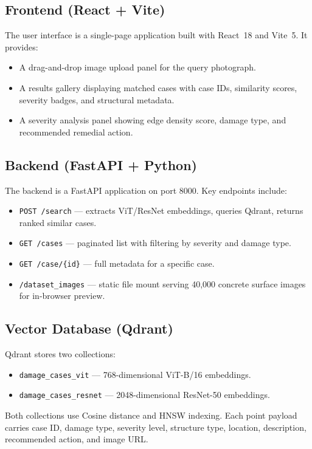\documentclass[conference]{IEEEtran}
\begin{document}
\subsection{Frontend (React + Vite)}
The user interface is a single-page application built with React~18 and Vite~5. It provides:
\begin{itemize}
  \item A drag-and-drop image upload panel for the query photograph.
  \item A results gallery displaying matched cases with case IDs, similarity scores, severity badges, and structural metadata.
  \item A severity analysis panel showing edge density score, damage type, and recommended remedial action.
\end{itemize}

\subsection{Backend (FastAPI + Python)}
The backend is a FastAPI application on port 8000. Key endpoints include:
\begin{itemize}
  \item \texttt{POST /search} --- extracts ViT/ResNet embeddings, queries Qdrant, returns ranked similar cases.
  \item \texttt{GET /cases} --- paginated list with filtering by severity and damage type.
  \item \texttt{GET /case/\{id\}} --- full metadata for a specific case.
  \item \texttt{/dataset\_images} --- static file mount serving 40,000 concrete surface images for in-browser preview.
\end{itemize}

\subsection{Vector Database (Qdrant)}
Qdrant stores two collections:
\begin{itemize}
  \item \texttt{damage\_cases\_vit} --- 768-dimensional ViT-B/16 embeddings.
  \item \texttt{damage\_cases\_resnet} --- 2048-dimensional ResNet-50 embeddings.
\end{itemize}
Both collections use Cosine distance and HNSW indexing. Each point payload carries case ID, damage type, severity level, structure type, location, description, recommended action, and image URL.
\end{document}
